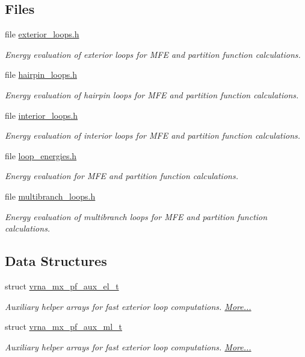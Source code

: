 \subsection*{Files}
\begin{DoxyCompactItemize}
\item 
file \hyperlink{exterior__loops_8h}{exterior\+\_\+loops.\+h}
\begin{DoxyCompactList}\small\item\em Energy evaluation of exterior loops for M\+FE and partition function calculations. \end{DoxyCompactList}\item 
file \hyperlink{hairpin__loops_8h}{hairpin\+\_\+loops.\+h}
\begin{DoxyCompactList}\small\item\em Energy evaluation of hairpin loops for M\+FE and partition function calculations. \end{DoxyCompactList}\item 
file \hyperlink{interior__loops_8h}{interior\+\_\+loops.\+h}
\begin{DoxyCompactList}\small\item\em Energy evaluation of interior loops for M\+FE and partition function calculations. \end{DoxyCompactList}\item 
file \hyperlink{loop__energies_8h}{loop\+\_\+energies.\+h}
\begin{DoxyCompactList}\small\item\em Energy evaluation for M\+FE and partition function calculations. \end{DoxyCompactList}\item 
file \hyperlink{multibranch__loops_8h}{multibranch\+\_\+loops.\+h}
\begin{DoxyCompactList}\small\item\em Energy evaluation of multibranch loops for M\+FE and partition function calculations. \end{DoxyCompactList}\end{DoxyCompactItemize}
\subsection*{Data Structures}
\begin{DoxyCompactItemize}
\item 
struct \hyperlink{group__loops_structvrna__mx__pf__aux__el__t}{vrna\+\_\+mx\+\_\+pf\+\_\+aux\+\_\+el\+\_\+t}
\begin{DoxyCompactList}\small\item\em Auxiliary helper arrays for fast exterior loop computations.  \hyperlink{group__loops_structvrna__mx__pf__aux__el__t}{More...}\end{DoxyCompactList}\item 
struct \hyperlink{group__loops_structvrna__mx__pf__aux__ml__t}{vrna\+\_\+mx\+\_\+pf\+\_\+aux\+\_\+ml\+\_\+t}
\begin{DoxyCompactList}\small\item\em Auxiliary helper arrays for fast exterior loop computations.  \hyperlink{group__loops_structvrna__mx__pf__aux__ml__t}{More...}\end{DoxyCompactList}\end{DoxyCompactItemize}
